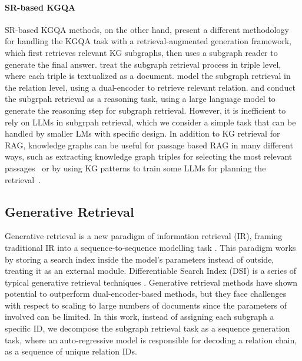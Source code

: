 \documentclass[11pt]{article}
\begin{document}
\paragraph{SR-based KGQA}
SR-based KGQA methods, on the other hand, present a different methodology for handling the KGQA task with a retrieval-augmented generation framework, which first retrieves relevant KG subgraphs, then uses a subgraph reader to generate the final answer. \citet{baek-etal-2023-knowledge} treat the subgraph retrieval process in triple level, where each triple is textualized as a document. \citet{zhang-etal-2022-subgraph} model the subgraph retrieval in the relation level, using a dual-encoder to retrieve relevant relation.
\citet{luo2024reasoning} and \citet{sun2024thinkongraph} conduct the subgrpah retrieval as a reasoning task, using a large language model to generate the reasoning step for subgraph retrieval. However, it is inefficient to rely on LLMs in subgrpah retrieval, which we consider a simple task that can be handled by smaller LMs with specific design.
In addition to KG retrieval for RAG, knowledge graphs can be useful for passage based RAG in many different ways, such as extracting knowledge graph triples for selecting the most relevant passages~\cite{GSGYS2024} or by using KG patterns to train some LLMs for planning the retrieval~\cite{WCHY+2024}. 

\subsection{Generative Retrieval}
Generative retrieval is a new paradigm of information retrieval (IR), framing traditional IR into a sequence-to-sequence modelling task \cite{DBLP:conf/emnlp/Pradeep0GLZLM023}. This paradigm works by storing a search index inside the model's parameters instead of outside,  treating it as an external module. Differentiable Search Index (DSI) is a series of typical generative retrieval techniques \citep{DBLP:conf/nips/Tay00NBM000GSCM22, DBLP:journals/corr/abs-2206-10128, chen-etal-2023-understanding}.
Generative retrieval methods have shown potential to outperform dual-encoder-based methods, but they face challenges with respect to scaling to large numbers of documents since the parameters of involved can be limited. In this work, instead of assigning each subgraph a specific ID, we decompose the subgraph retrieval task as a sequence generation task, where an auto-regressive model is responsible for decoding a relation chain, as a sequence of unique relation IDs.
\end{document}
